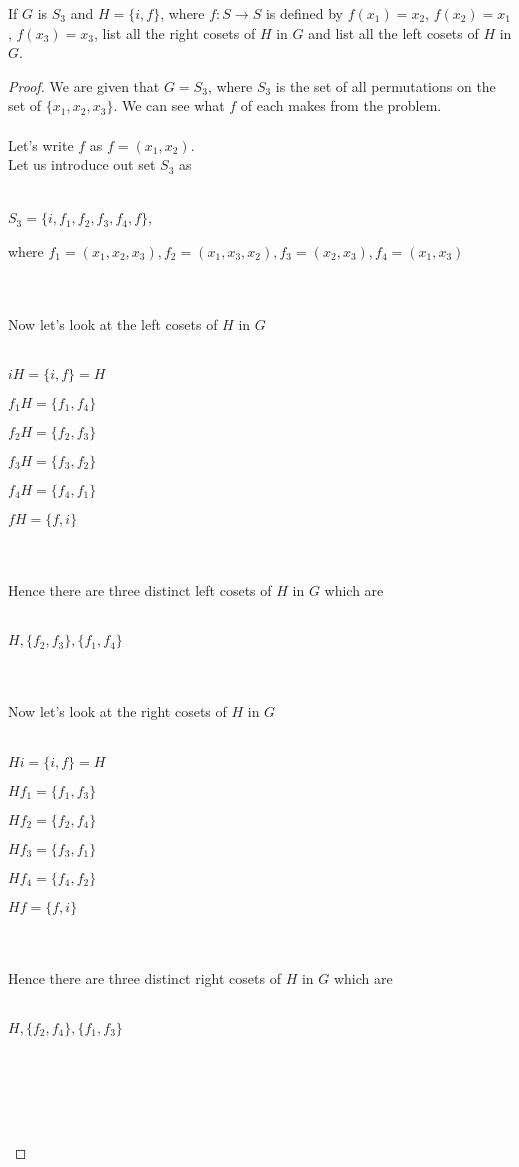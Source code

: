 \documentclass[12pt]{article}
\newenvironment{problem}[2][Problem]{\begin{trivlist}
\item[\hskip \labelsep {\bfseries #1}\hskip \labelsep {\bfseries #2.}]}{\end{trivlist}}
\begin{document}
 \begin{problem}{2.4.6}
If $G$ is $S_3$ and $H = \{i,f \}$, where $f: S \rightarrow S$ is defined by $f(x_1) = x_2$, $f(x_2)=x_1$, $f(x_3)=x_3$, list all the right cosets of $H$ in $G$ and list all the left cosets of $H$ in $G$.
\end{problem}

\begin{proof}
We are given that $G=S_3$, where $S_3$ is the set of all permutations on the set of $\{ x_1, x_2, x_3\}$. We can see what $f$ of each makes from the problem. \\ \\ 
Let's write $f$ as $f = (x_1,x_2)$. \\ 
Let us introduce out set $S_3$ as \\ \\
\centerline{$S_3 = \{i,f_1,f_2,f_3,f_4,f\}$,}
\centerline{where $f_1 = (x_1,x_2,x_3),f_2=(x_1,x_3,x_2),f_3=(x_2,x_3),f_4 = (x_1,x_3)$} \\ \\
Now let's look at the left cosets of $H$ in $G$ \\ \\
\centerline{$iH= \{i,f\} = H$} 
\centerline{$f_1H=\{f_1,f_4\}$}
\centerline{$f_2H=\{f_2,f_3\}$}
\centerline{$f_3H=\{f_3,f_2\}$}
\centerline{$f_4H=\{f_4,f_1\}$}
\centerline{$fH=\{f,i\}$} \\ \\
Hence there are three distinct left cosets of $H$ in $G$ which are \\ \\
\centerline{$H, \{f_2, f_3 \}, \{f_1,f_4\}$} \\ \\
Now let's look at the right cosets of $H$ in $G$ \\ \\
\centerline{$Hi = \{i,f\} = H$}
\centerline{$Hf_1 = \{f_1,f_3\}$}
\centerline{$Hf_2 = \{f_2,f_4\}$}
\centerline{$Hf_3=\{f_3,f_1\}$}
\centerline{$Hf_4=\{f_4,f_2\}$}
\centerline{$Hf=\{f,i\}$} \\ \\
Hence there are three distinct right cosets of $H$ in $G$ which are \\ \\
\centerline{$H,\{f_2,f_4\},\{f_1,f_3\}$} \\ \\
\centerline{} \\ \\
\end{proof}
\end{document}
